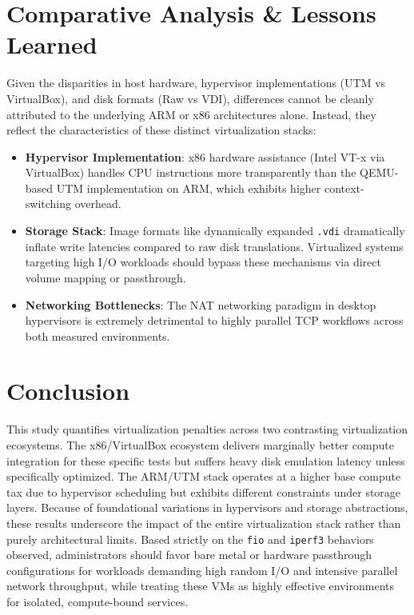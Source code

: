 \documentclass[conference]{IEEEtran}
\begin{document}
\section{Comparative Analysis \& Lessons Learned}

Given the disparities in host hardware, hypervisor implementations (UTM vs VirtualBox), and disk formats (Raw vs VDI), differences cannot be cleanly attributed to the underlying ARM or x86 architectures alone. Instead, they reflect the characteristics of these distinct virtualization stacks:
\begin{itemize}
    \item \textbf{Hypervisor Implementation}: x86 hardware assistance (Intel VT-x via VirtualBox) handles CPU instructions more transparently than the QEMU-based UTM implementation on ARM, which exhibits higher context-switching overhead.
    \item \textbf{Storage Stack}: Image formats like dynamically expanded \texttt{.vdi} dramatically inflate write latencies compared to raw disk translations. Virtualized systems targeting high I/O workloads should bypass these mechanisms via direct volume mapping or passthrough.
    \item \textbf{Networking Bottlenecks}: The NAT networking paradigm in desktop hypervisors is extremely detrimental to highly parallel TCP workflows across both measured environments.
\end{itemize}

\section{Conclusion}
This study quantifies virtualization penalties across two contrasting virtualization ecosystems. The x86/VirtualBox ecosystem delivers marginally better compute integration for these specific tests but suffers heavy disk emulation latency unless specifically optimized. The ARM/UTM stack operates at a higher base compute tax due to hypervisor scheduling but exhibits different constraints under storage layers. Because of foundational variations in hypervisors and storage abstractions, these results underscore the impact of the entire virtualization stack rather than purely architectural limits. Based strictly on the \texttt{fio} and \texttt{iperf3} behaviors observed, administrators should favor bare metal or hardware passthrough configurations for workloads demanding high random I/O and intensive parallel network throughput, while treating these VMs as highly effective environments for isolated, compute-bound services.
\end{document}

